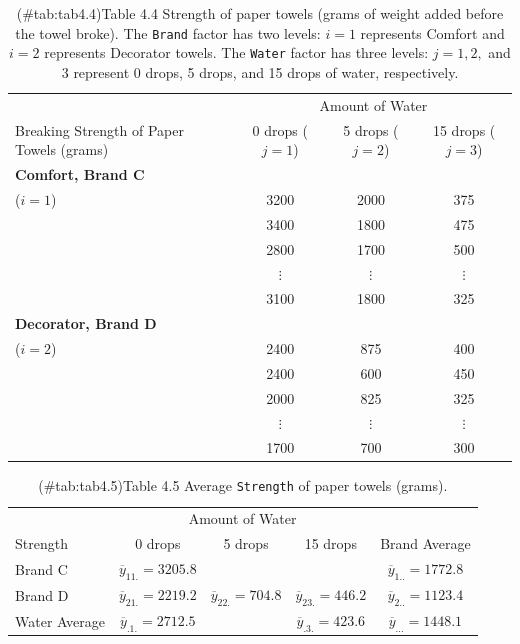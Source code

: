 \documentclass[
]{report}
\begin{document}
\begin{table}[!h]
\centering
\caption{(\#tab:tab4.4)Table 4.4 Strength of paper towels (grams of weight added before the towel broke). The \texttt{Brand} factor has two levels: $i = 1$ represents Comfort and $i = 2$ represents Decorator towels. The \texttt{Water} factor has three levels: $j = 1, 2,$ and 3 represent 0 drops, 5 drops, and 15 drops of water, respectively.}
\centering
\begin{tabular}[t]{>{\raggedright\arraybackslash}p{3.5cm}ccc}
\toprule
\multicolumn{1}{c}{ } & \multicolumn{3}{c}{Amount of Water} \\
\cmidrule(l{3pt}r{3pt}){2-4}
Breaking Strength of Paper Towels (grams) & 0 drops ($j=1$) & 5 drops ($j=2$) & 15 drops ($j=3$)\\
\midrule
\textbf{Comfort, Brand C} \\ ($i = 1$) & 3200 & 2000 & 375\\
 & 3400 & 1800 & 475\\
 & 2800 & 1700 & 500\\
 & $\vdots$ & $\vdots$ & \vphantom{1} $\vdots$\\
 & 3100 & 1800 & 325\\
\addlinespace
\textbf{Decorator, Brand D} \\ ($i = 2$) & 2400 & 875 & 400\\
 & 2400 & 600 & 450\\
 & 2000 & 825 & 325\\
 & $\vdots$ & $\vdots$ & $\vdots$\\
 & 1700 & 700 & 300\\
\bottomrule
\end{tabular}
\end{table}

\begin{table}[!h]
\centering
\caption{(\#tab:tab4.5)Table 4.5 Average \texttt{Strength} of paper towels (grams).}
\centering
\begin{tabular}[t]{lcccc}
\toprule
\multicolumn{1}{c}{ } & \multicolumn{3}{c}{Amount of Water} & \multicolumn{1}{c}{ } \\
\cmidrule(l{3pt}r{3pt}){2-4}
Strength & 0 drops & 5 drops & 15 drops & Brand Average\\
\midrule
Brand C & $\overline{y}_{11.} = 3205.8$ &  &  & $\overline{y}_{1..} = 1772.8$\\
Brand D & $\overline{y}_{21.} = 2219.2$ & $\overline{y}_{22.} = 704.8$ & $\overline{y}_{23.} = 446.2$ & $\overline{y}_{2..} = 1123.4$\\
Water Average & $\overline{y}_{.1.} = 2712.5$ &  & $\overline{y}_{.3.} = 423.6$ & $\overline{y}_{...} = 1448.1$\\
\bottomrule
\end{tabular}
\end{table}
\end{document}
